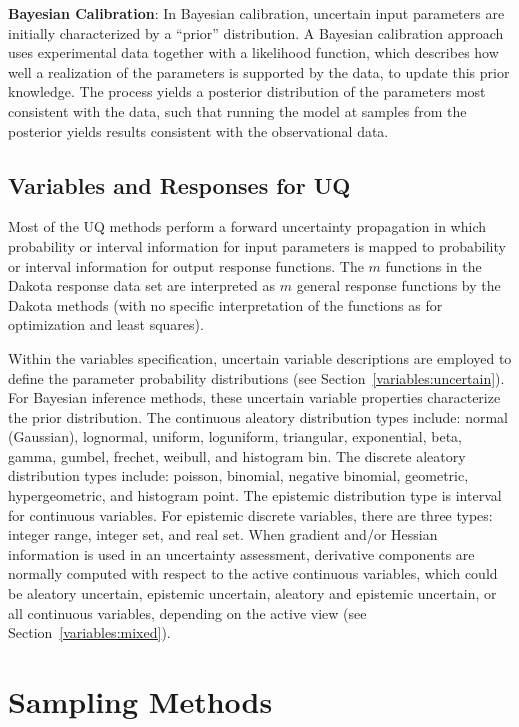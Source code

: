 \textbf{Bayesian Calibration}: In Bayesian calibration, uncertain
input parameters are initially characterized by a ``prior''
distribution. A Bayesian calibration approach uses experimental data
together with a likelihood function, which describes how well a
realization of the parameters is supported by the data, to update this
prior knowledge. The process yields a posterior distribution of the
parameters most consistent with the data, such that running the model
at samples from the posterior yields results consistent with the
observational data.


\subsection{Variables and Responses for UQ}\label{uq:overview:varsresp}

Most of the UQ methods perform a forward uncertainty propagation in
which probability or interval information for input parameters is
mapped to probability or interval information for output response
functions. The $m$ functions in the Dakota response data set are
interpreted as $m$ general response functions by the Dakota methods
(with no specific interpretation of the functions as for optimization
and least squares).

Within the variables specification, uncertain variable descriptions
are employed to define the parameter probability distributions (see
Section~\ref{variables:uncertain}). For Bayesian inference methods,
these uncertain variable properties characterize the prior
distribution. The continuous aleatory distribution types include:
normal (Gaussian), lognormal, uniform, loguniform, triangular,
exponential, beta, gamma, gumbel, frechet, weibull, and histogram
bin. The discrete aleatory distribution types include: poisson,
binomial, negative binomial, geometric, hypergeometric, and histogram
point. The epistemic distribution type is interval for continuous
variables. For epistemic discrete variables, there are three types:
integer range, integer set, and real set.  When gradient and/or
Hessian information is used in an uncertainty assessment, derivative
components are normally computed with respect to the active continuous
variables, which could be aleatory uncertain, epistemic uncertain,
aleatory and epistemic uncertain, or all continuous variables,
depending on the active view (see Section~\ref{variables:mixed}).

\section{Sampling Methods}\label{uq:sampling}

